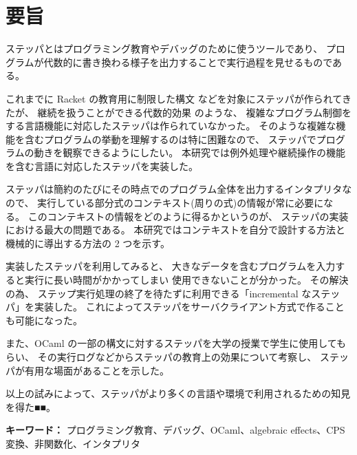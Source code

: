 \chapter*{要旨}

ステッパとはプログラミング教育やデバッグのために使うツールであり、
プログラムが代数的に書き換わる様子を出力することで実行過程を見せるものである。

これまでに Racket \cite{clements01} の教育用に制限した構文
などを対象にステッパが作られてきたが、
継続を扱うことができる代数的効果 \cite{PRETNAR201519} のような、
複雑なプログラム制御をする言語機能に対応したステッパは作られていなかった。
そのような複雑な機能を含むプログラムの挙動を理解するのは特に困難なので、
ステッパでプログラムの動きを観察できるようにしたい。
本研究では例外処理や継続操作の機能を含む言語に対応したステッパを実装した。

ステッパは簡約のたびにその時点でのプログラム全体を出力するインタプリタなので、
実行している部分式のコンテキスト(周りの式)の情報が常に必要になる。
このコンテキストの情報をどのように得るかというのが、
ステッパの実装における最大の問題である。
本研究ではコンテキストを自分で設計する方法と
機械的に導出する方法の 2 つを示す。

実装したステッパを利用してみると、
大きなデータを含むプログラムを入力すると実行に長い時間がかかってしまい
使用できないことが分かった。
その解決の為、
ステップ実行処理の終了を待たずに利用できる「incremental なステッパ」を実装した。
これによってステッパをサーバクライアント方式で作ることも可能になった。

また、OCaml の一部の構文に対するステッパを大学の授業で学生に使用してもらい、
その実行ログなどからステッパの教育上の効果について考察し、
ステッパが有用な場面があることを示した。

以上の試みによって、ステッパがより多くの言語や環境で利用されるための知見を得た■■。

\vspace{10mm}

{\bf キーワード：}
プログラミング教育、デバッグ、OCaml、algebraic effects、CPS 変換、非関数化、インタプリタ\ 
